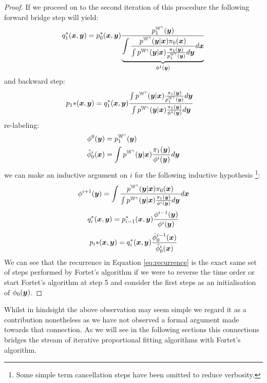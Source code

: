 \documentclass[a4paper,12pt,twoside,openright]{report}
\theoremstyle{definition}
\begin{document}
\begin{proof}
If we proceed on to the second iteration of this procedure the  following forward bridge step will yield:
\begin{align}
    q_1^{*} ({\bm{x}}, {\bm{y}}) =  p_0^{*} ({\bm{x}}, {\bm{y}}) \frac{p^{\mathbb{W}^{\gamma}}_1({\bm{y}})}{ \underbrace{\displaystyle\int \frac{p^{\mathbb{W}^{\gamma}}({\bm{y}}| {\bm{x}})\pi_0({\bm{x}})}{\int p^{\mathbb{W}^{\gamma}}({\bm{y}}| {\bm{x}}) \frac{\pi_1({\bm{y}})}{p^{\mathbb{W}^{\gamma}}_1({\bm{y}})} d{\bm{y}}}d{\bm{x}}}_{{\phi}^{1}({\bm{y}})}} 
\end{align}
and backward step:
\begin{align}
    p_1{*} ({\bm{x}}, {\bm{y}}) &= q_1^{*} ({\bm{x}}, {\bm{y}}) \frac{\int    p^{\mathbb{W}^{\gamma}}({\bm{y}}| {\bm{x}}) \frac{\pi_1({\bm{y}})}{p^{\mathbb{W}^{\gamma}}_1({\bm{y}})}  d {\bm{y}}}{\int    p^{\mathbb{W}^{\gamma}}({\bm{y}}| {\bm{x}}) \frac{\pi_1({\bm{y}})}{{\phi}^{1}({\bm{y}})}  d {\bm{y}}}
\end{align}
re-labeling: 
\begin{align}
    \phi^0({\bm{y}})&=p^{\mathbb{W}^{\gamma}}_1({\bm{y}}) \\ 
    \hat{\phi}_0^{i}({\bm{x}}) &= \int  p^{\mathbb{W}^{\gamma}}({\bm{y}}| {\bm{x}}) \frac{\pi_1({\bm{y}})}{{\phi}^{i}({\bm{y}})}  d {\bm{y}}
\end{align}
we can make an inductive argument on $i$ for the following inductive hypothesis \footnote{Some simple term cancellation steps have been omitted to reduce verbosity.}:
\begin{align} \label{eq:recurrence}
  {\phi}^{i+1}({\bm{y}}) =  \displaystyle\int \frac{p^{\mathbb{W}^{\gamma}}({\bm{y}}| {\bm{x}})\pi_0({\bm{x}})}{\int p^{\mathbb{W}^{\gamma}}({\bm{y}}| {\bm{x}}) \frac{\pi_1({\bm{y}})}{\phi^i({\bm{y}})} d{\bm{y}}}d{\bm{x}}
 \end{align}
 \begin{align}
  q_i^{*} ({\bm{x}}, {\bm{y}}) =   p_{i-1}^{*} ({\bm{x}}, {\bm{y}}) \frac{\phi^{i-1}({\bm{y}})}{{\phi}^{i}({\bm{y}})} 
\end{align}
 \begin{align}
      p_i{*} ({\bm{x}}, {\bm{y}}) =     q_i^{*} ({\bm{x}}, {\bm{y}}) \frac{\hat{\phi}_0^{i-1}({\bm{x}})}{\hat{\phi}_0^{i}({\bm{x}})} 
\end{align}
We can see that the  recurrence in Equation \ref{eq:recurrence} is the exact same set of steps performed by Fortet's algorithm if we were to reverse the time order or start Fortet's algorithm at step 5 and consider the first steps  as an initialisation of $\phi_0({\bm{y}})$.
\end{proof}

Whilst in hindsight the above observation may seem simple we regard it as a contribution nonetheless as we have not observed a formal argument made towards that connection. As we will see in the following sections this connections bridges the stream of iterative proportional fitting algorithms with Fortet's algorithm.
\end{document}
